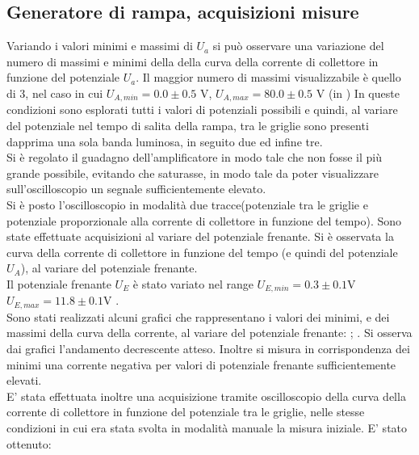 \subsection{Generatore di rampa, acquisizioni misure}
Variando i valori minimi e massimi di $U_{a}$ si può osservare una variazione del numero di massimi e minimi della della curva della corrente di collettore in funzione del potenziale $U_{a}$. Il maggior numero di massimi visualizzabile è quello di 3, nel caso in cui $U_{A,min}= 0.0 \pm 0.5$ V, $U_{A,max}= 80.0 \pm 0.5$ V (in ) 
In queste condizioni sono esplorati tutti i valori di potenziali possibili e quindi, al variare del potenziale nel tempo di salita della rampa, tra le griglie sono presenti dapprima una sola banda luminosa, in seguito due ed infine tre.\\
Si è regolato il guadagno dell'amplificatore in modo tale che non fosse il più grande possibile, evitando che saturasse, in modo tale da poter visualizzare sull'oscilloscopio un segnale sufficientemente elevato.\\
Si è posto l'oscilloscopio in modalità due tracce(potenziale tra le griglie e potenziale proporzionale alla corrente di collettore in funzione del tempo). Sono state effettuate acquisizioni al variare del potenziale frenante.
Si è osservata la curva della corrente di collettore in funzione del tempo (e quindi del potenziale $U_{A}$), al variare del potenziale frenante.\\
 Il potenziale frenante $U_{E}$ è stato variato nel range $U_{E,min}=0.3\pm 0.1$V  $U_{E,max}=11.8 \pm 0.1$V . \\ 
Sono stati realizzati alcuni grafici che rappresentano i valori dei minimi, e dei massimi della curva della corrente, al variare del potenziale frenante: ; .
Si osserva dai grafici l'andamento decrescente atteso. Inoltre si misura in corrispondenza dei minimi una corrente negativa per valori di potenziale frenante sufficientemente elevati. \\
E' stata effettuata inoltre una acquisizione tramite oscilloscopio della curva della corrente di collettore in funzione del potenziale tra le griglie, nelle stesse condizioni in cui era stata svolta in modalità manuale la misura iniziale. E' stato ottenuto: